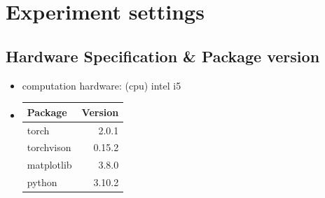\documentclass[12pt]{article}
\begin{document}

\section{Experiment settings}

\subsection{Hardware Specification \& Package version}
\begin{itemize}
    \item computation hardware: (cpu) intel i5
    \item \begin{center}
      \begin{tabular}{l|r}
            Package & Version \\\hline
            torch & 2.0.1 \\
            torchvison & 0.15.2 \\
            matplotlib & 3.8.0 \\
            python & 3.10.2
      \end{tabular}
    \end{center}
\end{itemize}
\end{document}

